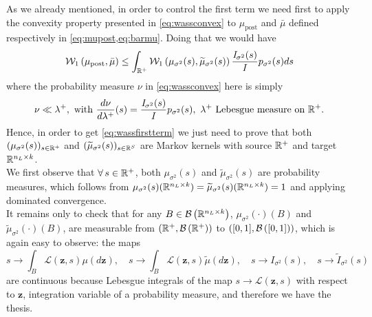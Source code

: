 As we already mentioned, in order to control the first term we need first to apply the convexity property presented in \cref{eq:wassconvex} to $\mu_{\mathrm{post}}$ and $\bar{\mu}$ defined respectively in \cref{eq:mupost,eq:barmu}.
Doing that we would have
\begin{equation} \label{eq:wassfirstterm}
	\wass[1]{\mu_{\mathrm{post}}}{\bar{\mu}} \leq \int_{\real^+} \wass[1]{\mu_{\sigma^2}(s)}{\widetilde{\mu}_{\sigma^2}(s)} \frac{\mathit{I}_{\sigma^2}(s)}{\mathit{I}} p_{\sigma^2}(s) ds
\end{equation}
where the probability measure $\nu$ in \cref{eq:wassconvex} here is simply
\begin{equation*}
	\nu \ll \lambda^+, \text{ with } \frac{d\nu}{d\lambda^+}(s) = \frac{\mathit{I}_{\sigma^2}(s)}{\mathit{I}} p_{\sigma^2}(s), \ \lambda^+ \text{ Lebesgue measure on } \real^+.
\end{equation*}
Hence, in order to get \cref{eq:wassfirstterm} we just need to prove that both $(\mu_{\sigma^2}(s))_{s \in \real^+}$ and $(\widetilde{\mu}_{\sigma^2}(s))_{s \in \real^S}$ are Markov kernels with source $\real^+$ and target $\real^{n_L \times k}$. \\
We first observe that $\forall s \in \real^+$, both $\mu_{\sigma^2}(s)$ and $\widetilde{\mu}_{\sigma^2}(s)$ are probability measures, which follows from $\mu_{\sigma^2}(s)(\real^{n_L \times k}) = \widetilde{\mu}_{\sigma^2}(s)(\real^{n_L \times k}) = 1$ and applying dominated convergence. \\
It remains only to check that for any $B \in \borel{\real^{n_L \times k}}$, $\mu_{\sigma^2}(\cdot)(B)$ and $\widetilde{\mu}_{\sigma^2}(\cdot)(B)$, are measurable from $(\real^+, \borel{\real^+})$ to $([0, 1], \borel{[0, 1]})$, which is again easy to observe:  the maps
\begin{equation*}
	s \to \int_B \mathcal{L}(\bm{z}, s) \mu(d\bm{z}), \quad s \to \int_B \mathcal{L}(\bm{z}, s) \widetilde{\mu}(d\bm{z}), \quad s \to \mathit{I}_{\sigma^2}(s), \quad s \to \widetilde{\mathit{I}}_{\sigma^2}(s) 
\end{equation*}
are continuous because Lebesgue integrals of the map $s \to \mathcal{L}(\bm{z}, s)$ with respect to $\bm{z}$, integration variable of a probability measure, and therefore we have the thesis.

\smallskip

